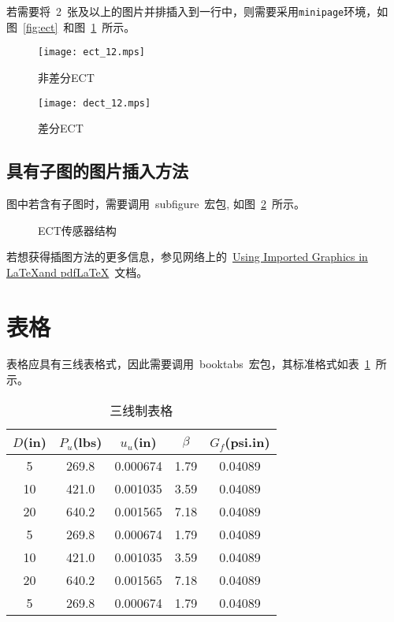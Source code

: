 若需要将~2~张及以上的图片并排插入到一行中，则需要采用\verb|minipage|环境，如图~\ref{fig:ect}~和图~\ref{fig:dect}~所示。
\begin{figure}[htbp]
\centering
\begin{minipage}{0.4\textwidth}
\centering
\texttt{[image: ect\_12.mps]}
\caption{非差分ECT}\label{fig:ect}
\end{minipage}
\hspace{0.1\textwidth}
\begin{minipage}{0.4\textwidth}
\centering
\texttt{[image: dect\_12.mps]}
\caption{差分ECT}\label{fig:dect}
\end{minipage}
\vspace{\baselineskip}
\end{figure}
  

\subsection{具有子图的图片插入方法}

图中若含有子图时，需要调用~subfigure~宏包, 如图~\ref{fig:subfig}~所示。
\begin{figure}[htbp]
  \centering
  \caption{ECT传感器结构}\label{fig:subfig}
\vspace{\baselineskip}
\end{figure}

若想获得插图方法的更多信息，参见网络上的~\href{ftp://ftp.tex.ac.uk/tex-archive/info/epslatex.pdf}{Using Imported Graphics in \LaTeX and pdf\LaTeX}~文档。 



\section{表格}

表格应具有三线表格式，因此需要调用~booktabs~宏包，其标准格式如表~\ref{tab:ch1:tab1}~所示。
\begin{table}[htbp]
\caption{三线制表格}\label{tab:ch1:tab1}
\vspace{0.5em}\centering\wuhao
\begin{tabular}{ccccc}
\toprule[1.5pt]
$D$(in) & $P_u$(lbs) & $u_u$(in) & $\beta$ & $G_f$(psi.in)\\
\midrule[1pt]
 5 & 269.8 & 0.000674 & 1.79 & 0.04089\\
10 & 421.0 & 0.001035 & 3.59 & 0.04089\\
20 & 640.2 & 0.001565 & 7.18 & 0.04089\\
 5 & 269.8 & 0.000674 & 1.79 & 0.04089\\
10 & 421.0 & 0.001035 & 3.59 & 0.04089\\
20 & 640.2 & 0.001565 & 7.18 & 0.04089\\
 5 & 269.8 & 0.000674 & 1.79 & 0.04089\\
\bottomrule[1.5pt]
\end{tabular}
\vspace{\baselineskip}
\end{table}

